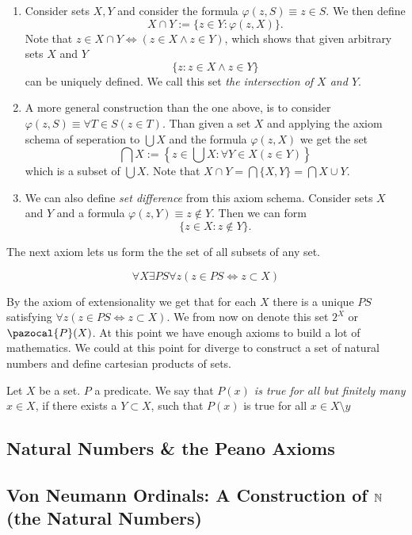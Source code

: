 \begin{example}
    \begin{enumerate}
        \item Consider sets $X,Y$ and consider the formula $\varphi(z,S) \equiv z\in S$. We then define 
        $$X\cap Y := \{ z\in Y : \varphi(z,X)\}.$$
        Note that $z\in X\cap Y\iff (z\in X\wedge z\in Y)$, which shows that given arbitrary sets $X$ and $Y$
        $$\{z : z\in X\wedge z\in Y\}$$
        can be uniquely defined. We call this set \textit{the intersection of $X$ and $Y$}.
        \item A more general construction than the one above, is to consider $\varphi(z,S) \equiv \forall T\in S(z\in T)$. Than given a set $X$ and applying the axiom schema of seperation to $\bigcup X$ and the formula $\varphi(z,X)$ we get the set 
        $$ \bigcap X := \left\{z \in \bigcup X : \forall Y \in X(z\in Y)\right\}$$
        which is a subset of $\bigcup X$. Note that $X\cap Y = \bigcap\{X, Y\} = \bigcap X\cup Y$.
        \item We can also define \textit{set difference}  from this axiom schema. Consider sets $X$ and $Y$ and a formula $\varphi(z,Y) \equiv z\notin Y$. Then we can form
        $$ \{z\in X : z\notin Y\}.$$
    \end{enumerate}
\end{example}
The next axiom lets us form the the set of all subsets of any set. 
\begin{axioms}
    $$\forall X\exists PS\forall z(z\in PS\iff z \subset X)$$
\end{axioms}
By the axiom of extensionality we get that for each $X$ there is a unique $PS$ satisfying $\forall z(z \in PS \iff z\subset X)$. We from now on denote this set $2^X$ or $\pazocal{P}(X)$. At this point we have enough axioms to build a lot of mathematics. We could at this point for diverge to construct a set of natural numbers and define cartesian products of sets. 
\begin{definition}
    Let $X$ be a set. $P$ a predicate. We say that \textit{$P(x)$ is true for all but finitely many $x\in X$}, if there exists a $Y\subset X$, such that $P(x)$ is true for all $x\in X\setminus y$
\end{definition}
\subsection{Natural Numbers \& the Peano Axioms}
\subsection{Von Neumann Ordinals: A Construction of $\mathbb{N}$ (the Natural Numbers)}
